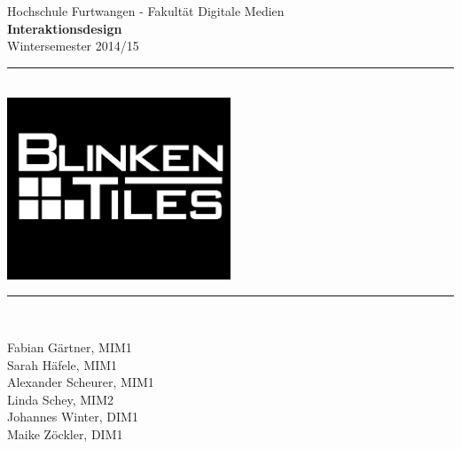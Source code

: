 \begin{titlepage}

\newcommand{\HRule}{\rule{\linewidth}{0.5mm}} %

\center %
 

\Large Hochschule Furtwangen - Fakultät Digitale Medien\\[0.5cm] %
{\Large \bfseries Interaktionsdesign}\\[0.5cm] %
\large Wintersemester 2014/15\\[0.5cm] %


\HRule \\[0.2cm]
\includegraphics[width=0.5\textwidth]{images/logo_final}\\[-0.35cm]
\HRule \\[0.7cm]
 

\begin{minipage}{0.55\textwidth}
\begin{flushleft} \large
Fabian Gärtner, MIM1\\
Sarah Häfele, MIM1\\
Alexander Scheurer, MIM1\\
Linda Schey, MIM2\\
Johannes Winter, DIM1\\
Maike Zöckler, DIM1\\


\end{flushleft}
\end{minipage}
\end{titlepage}
